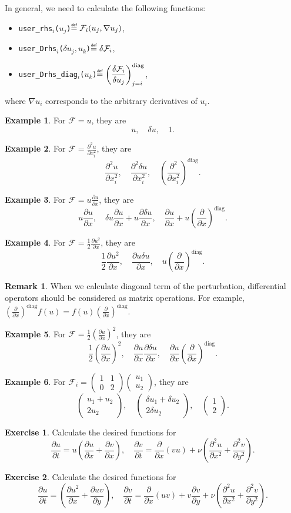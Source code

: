 \documentclass{article}
\newcommand{\pder}[2][]{\frac{\partial#1}{\partial#2}}
\newcommand{\dder}[2][]{\frac{\delta#1}{\delta#2}}
\newcommand{\pderdual}[2][]{\frac{\partial^2#1}{\partial#2^2}}
\newcommand{\FF}{\mathcal{F}}
\newcommand{\diag}{^\mathrm{diag}}
\newcommand{\pert}[1]{\delta#1}
\newcommand{\eqdef}{\mathrel{\overset{\makebox[0pt]{\mbox{\normalfont\tiny\sffamily def}}}{=}}}
\newcommand{\matr}[4]{\begin{pmatrix} #1 & #2\\#3 & #4\end{pmatrix}}
\newcommand{\vect}[2]{\begin{pmatrix} #1\\#2\end{pmatrix}}
\newcommand{\func}[4]{\texttt{user\_#1\(_{#3}\)(\(#2\))}\(\eqdef\displaystyle#4\)}
\theoremstyle{definition}
\newtheorem{example}{Example}
\newtheorem{remark}{Remark}
\newtheorem{exercise}{Exercise}
\begin{document}
In general, we need to calculate the following functions:
\begin{itemize}
    \item \func{rhs}{u_j}{i}{ \FF_i(u_j, \nabla{u_j}) },
    \item \func{Drhs}{\pert{u_j},u_k}{i}{ \pert{\FF_i} },
    \item \func{Drhs\_diag}{u_k}{i}{ \left( \dder[\FF_i]{u_j} \right)_{j=i}\diag},
\end{itemize}
where \(\nabla{u_i}\) corresponds to the arbitrary derivatives of \(u_i\).
\begin{example}
    For \(\FF = u\), they are \[ 
        u, \quad \pert{u}, \quad 1.
    \]
\end{example}
\begin{example}
    For \(\FF = \pderdual[u]{x_i}\), they are \[ 
        \pderdual[u]{x_i}, \quad \pderdual[\pert{u}]{x_i}, \quad \left( \pderdual{x_i} \right)\diag.
    \]
\end{example}
\begin{example}
    For \(\FF = u\pder[u]{x}\), they are \[ 
        u\pder[u]{x}, \quad \pert{u}\pder[u]{x} + u\pder[\pert{u}]{x},
        \quad \pder[u]{x} + u \left( \pder{x}\right)\diag.
    \]
\end{example}
\begin{example}
    For \(\FF = \frac12\pder[u^2]{x}\), they are \[ 
        \frac12\pder[u^2]{x}, \quad \pder[u\pert{u}]{x}, \quad u\left(\pder{x}\right)\diag.
    \]
\end{example}
\begin{remark}
    When we calculate diagonal term of the perturbation,
    differential operators should be considered as matrix operations.
    For example, \(\left(\pder{x}\right)\diag f(u) = f(u)\left(\pder{x}\right)\diag\).
\end{remark}
\begin{example}
    For \(\FF = \frac12\left(\pder[u]{x}\right)^2\), they are \[ 
        \frac12\left(\pder[u]{x}\right)^2, \quad \pder[u]{x}\pder[\pert{u}]{x},
        \quad \pder[u]{x}\left(\pder{x}\right)\diag.
    \]
\end{example}
\begin{example}
    For \(\FF_i = \matr1102\vect{u_1}{u_2}\), they are \[
        \vect{u_1+u_2}{2u_2}, \quad
        \vect{\pert{u_1}+\pert{u_2}}{2\pert{u_2}}, \quad
        \vect{1}{2}.
    \]
\end{example}

\begin{exercise}
    Calculate the desired functions for \[
        \pder[u]{t} = u\left(\pder[u]{x} + \pder[v]{x}\right), \quad
        \pder[v]{t} = \pder{x}(vu) + \nu\left(\pderdual[u]{x}+\pderdual[v]{y}\right).
    \] 
\end{exercise}

\begin{exercise}
    Calculate the desired functions for \[
        \pder[u]{t} = \left(\pder[u^2]{x} + \pder[uv]{y}\right), \quad
        \pder[v]{t} = \pder{x}(uv) + v \pder[v]{y} + \nu\left(\pderdual[u]{x}+\pderdual[v]{y}\right).
    \] 
\end{exercise}
\end{document}
